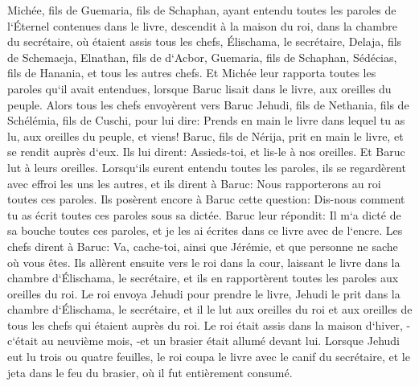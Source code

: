 \verse Michée, fils de Guemaria, fils de Schaphan, ayant entendu toutes les paroles de l`Éternel contenues dans le livre, 
\verse descendit à la maison du roi, dans la chambre du secrétaire, où étaient assis tous les chefs, Élischama, le secrétaire, Delaja, fils de Schemaeja, Elnathan, fils de d`Acbor, Guemaria, fils de Schaphan, Sédécias, fils de Hanania, et tous les autres chefs. 
\verse Et Michée leur rapporta toutes les paroles qu`il avait entendues, lorsque Baruc lisait dans le livre, aux oreilles du peuple. 
\verse Alors tous les chefs envoyèrent vers Baruc Jehudi, fils de Nethania, fils de Schélémia, fils de Cuschi, pour lui dire: Prends en main le livre dans lequel tu as lu, aux oreilles du peuple, et viens! Baruc, fils de Nérija, prit en main le livre, et se rendit auprès d`eux. 
\verse Ils lui dirent: Assieds-toi, et lis-le à nos oreilles. Et Baruc lut à leurs oreilles. 
\verse Lorsqu`ils eurent entendu toutes les paroles, ils se regardèrent avec effroi les uns les autres, et ils dirent à Baruc: Nous rapporterons au roi toutes ces paroles. 
\verse Ils posèrent encore à Baruc cette question: Dis-nous comment tu as écrit toutes ces paroles sous sa dictée. 
\verse Baruc leur répondit: Il m`a dicté de sa bouche toutes ces paroles, et je les ai écrites dans ce livre avec de l`encre. 
\verse Les chefs dirent à Baruc: Va, cache-toi, ainsi que Jérémie, et que personne ne sache où vous êtes. 
\verse Ils allèrent ensuite vers le roi dans la cour, laissant le livre dans la chambre d`Élischama, le secrétaire, et ils en rapportèrent toutes les paroles aux oreilles du roi. 
\verse Le roi envoya Jehudi pour prendre le livre, Jehudi le prit dans la chambre d`Élischama, le secrétaire, et il le lut aux oreilles du roi et aux oreilles de tous les chefs qui étaient auprès du roi. 
\verse Le roi était assis dans la maison d`hiver, -c`était au neuvième mois, -et un brasier était allumé devant lui. 
\verse Lorsque Jehudi eut lu trois ou quatre feuilles, le roi coupa le livre avec le canif du secrétaire, et le jeta dans le feu du brasier, où il fut entièrement consumé. 
